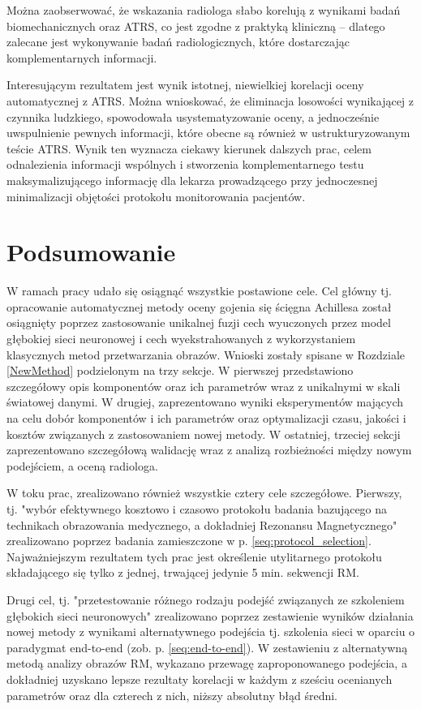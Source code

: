 Można zaobserwować, że wskazania radiologa słabo korelują z wynikami badań biomechanicznych oraz ATRS, co jest zgodne z praktyką kliniczną -- dlatego zalecane jest wykonywanie badań radiologicznych, które dostarczając komplementarnych informacji.

Interesującym rezultatem jest wynik istotnej, niewielkiej korelacji oceny automatycznej z ATRS. Można wnioskować, że eliminacja losowości wynikającej z czynnika ludzkiego, spowodowała usystematyzowanie oceny, a jednocześnie uwspulnienie pewnych informacji, które obecne są również w ustrukturyzowanym teście ATRS. Wynik ten wyznacza ciekawy kierunek dalszych prac, celem odnalezienia informacji wspólnych i stworzenia komplementarnego testu maksymalizującego informację dla lekarza prowadzącego przy jednoczesnej minimalizacji objętości protokołu monitorowania pacjentów.

\chapter{Podsumowanie}

W ramach pracy udało się osiągnąć wszystkie postawione cele. Cel główny tj. opracowanie automatycznej metody oceny gojenia się ścięgna Achillesa został osiągnięty poprzez zastosowanie unikalnej fuzji cech wyuczonych przez model głębokiej sieci neuronowej i cech wyekstrahowanych z wykorzystaniem klasycznych metod przetwarzania obrazów. Wnioski zostały spisane w Rozdziale \ref{NewMethod} podzielonym na trzy sekcje. W pierwszej przedstawiono szczegółowy opis komponentów oraz ich parametrów wraz z unikalnymi w skali światowej danymi. W drugiej, zaprezentowano wyniki eksperymentów mających na celu dobór komponentów i ich parametrów oraz optymalizacji czasu, jakości i kosztów związanych z zastosowaniem nowej metody. W ostatniej, trzeciej sekcji zaprezentowano szczegółową walidację wraz z analizą rozbieżności między nowym podejściem, a oceną radiologa.

W toku prac, zrealizowano również wszystkie cztery cele szczegółowe. Pierwszy, tj. "wybór efektywnego kosztowo i czasowo protokołu badania bazującego na technikach obrazowania medycznego, a dokładniej Rezonansu Magnetycznego" zrealizowano poprzez badania zamieszczone w p. \ref{seq:protocol_selection}. Najważniejszym rezultatem tych prac jest określenie utylitarnego protokołu składającego się tylko z jednej, trwającej jedynie 5 min. sekwencji RM. 

Drugi cel, tj. "przetestowanie różnego rodzaju podejść związanych ze szkoleniem głębokich sieci neuronowych" zrealizowano poprzez zestawienie wyników działania nowej metody z wynikami alternatywnego podejścia tj. szkolenia sieci w oparciu o paradygmat end-to-end (zob. p. \ref{seq:end-to-end}). W zestawieniu z alternatywną metodą analizy obrazów RM, wykazano przewagę zaproponowanego podejścia, a dokładniej uzyskano lepsze rezultaty korelacji w każdym z sześciu ocenianych parametrów oraz dla czterech z nich, niższy absolutny błąd średni.


